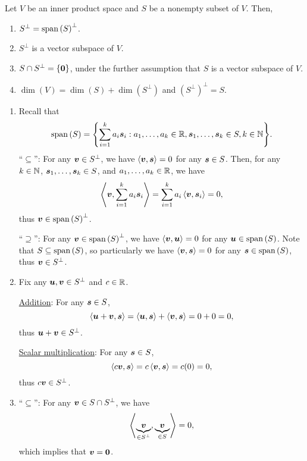 \begin{enumerate}
\begin{proposition}
\label{prp:orthog-comp-prop}
Let \(V\) be an inner product space and \(S\) be a nonempty subset of \(V\). Then,
\begin{enumerate}
\item \(S^{\perp}=\operatorname{span}\qty(S)^{\perp}\).
\item \(S^{\perp}\) is a vector subspace of \(V\).
\item \(S\cap S^{\perp}=\{\vb*{0}\}\), under the further assumption that \(S\) is a vector subspace of \(V\).
\item \(\dim(V)=\dim(S)+\dim(S^{\perp})\) and \((S^{\perp})^{\perp}=S\).
\end{enumerate}
\end{proposition}
\begin{pf}
\begin{enumerate}
\item Recall that
\[
\operatorname{span}\qty(S)=\qty{\sum_{i=1}^{k}a_i\vb*{s}_i:a_1,\dotsc,a_k\in\mathbb{R}, \vb*{s}_1,\dotsc,\vb*{s}_k\in S, k\in\mathbb{N}}.
\]
``\(\subseteq\)'': For any \(\vb*{v}\in S^{\perp}\), we have
\(\left\langle \vb*{v},\vb*{s}\right\rangle=0\) for any \(\vb*{s}\in S\). Then, for any
\(k\in\mathbb{N}\), \(\vb*{s}_1,\dotsc,\vb*{s}_k\in S\), and \(a_1,\dotsc,a_k\in\mathbb{R}\),
we have
\[
\left\langle \vb*{v},\sum_{i=1}^{k}a_i\vb*{s}_i\right\rangle
=\sum_{i=1}^{k}a_i\left\langle \vb*{v},\vb*{s}_i\right\rangle
=0,
\]
thus \(\vb*{v}\in\operatorname{span}\qty(S)^{\perp}\).

``\(\supseteq\)'': For any \(\vb*{v}\in\operatorname{span}\qty(S)^{\perp}\), we have
\(\left\langle \vb*{v},\vb*{u}\right\rangle=0\) for any \(\vb*{u}\in\operatorname{span}\qty(S)\). Note that
\(S\subseteq \operatorname{span}\qty(S)\), so particularly we have \(\left\langle \vb*{v},\vb*{s}\right\rangle=0\)
for any \(\vb*{s}\in\operatorname{span}\qty(S)\), thus \(\vb*{v}\in S^{\perp}\).

\item Fix any \(\vb*{u},\vb*{v}\in S^{\perp}\) and \(c\in\mathbb{R}\).

\underline{Addition}: For any \(\vb*{s}\in S\),
\[
\left\langle \vb*{u}+\vb*{v},\vb*{s}\right\rangle
=\left\langle \vb*{u},\vb*{s}\right\rangle
+\left\langle \vb*{v},\vb*{s}\right\rangle
=0+0=0,
\]
thus \(\vb*{u}+\vb*{v}\in S^{\perp}\).

\underline{Scalar multiplication}: For any \(\vb*{s}\in S\),
\[
\left\langle c\vb*{v},\vb*{s}\right\rangle=c\left\langle \vb*{v},\vb*{s}\right\rangle=c(0)=0,
\]
thus \(c\vb*{v}\in S^{\perp}\).

\item ``\(\subseteq\)'': For any \(\vb*{v}\in S\cap S^{\perp}\), we have
\[
\left\langle \underbrace{\vb*{v}}_{\in S^{\perp}},\underbrace{\vb*{v}}_{\in S}\right\rangle
=0,
\]
which implies that \(\vb*{v}=\vb*{0}\).


\end{enumerate}
\end{pf}
\end{enumerate}
